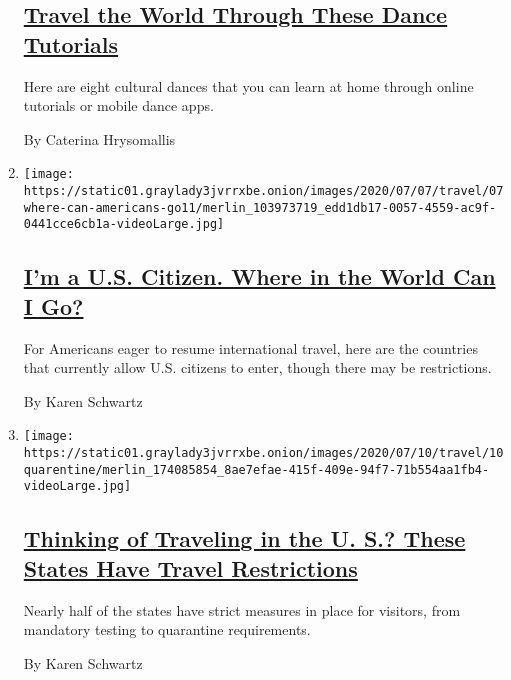 \begin{enumerate}
  \hypertarget{travel-the-world-through-these-dance-tutorials}{%
  \subsection{\texorpdfstring{\href{/2020/07/25/travel/cultural-dances-tutorials.html}{Travel
  the World Through These Dance
  Tutorials}}{Travel the World Through These Dance Tutorials}}\label{travel-the-world-through-these-dance-tutorials}}

  Here are eight cultural dances that you can learn at home through
  online tutorials or mobile dance apps.

  By Caterina Hrysomallis
\item
  \texttt{[image: https://static01.graylady3jvrrxbe.onion/images/2020/07/07/travel/07where-can-americans-go11/merlin\_103973719\_edd1db17-0057-4559-ac9f-0441cce6cb1a-videoLarge.jpg]}

  \hypertarget{im-a-us-citizen-where-in-the-world-can-i-go}{%
  \subsection{\texorpdfstring{\href{/2020/07/07/travel/american-travelers-restrictions-coronavirus.html}{I'm
  a U.S. Citizen. Where in the World Can I
  Go?}}{I'm a U.S. Citizen. Where in the World Can I Go?}}\label{im-a-us-citizen-where-in-the-world-can-i-go}}

  For Americans eager to resume international travel, here are the
  countries that currently allow U.S. citizens to enter, though there
  may be restrictions.

  By Karen Schwartz
\item
  \texttt{[image: https://static01.graylady3jvrrxbe.onion/images/2020/07/10/travel/10quarentine/merlin\_174085854\_8ae7efae-415f-409e-94f7-71b554aa1fb4-videoLarge.jpg]}

  \hypertarget{thinking-of-traveling-in-the-u-s-these-states-have-travel-restrictions}{%
  \subsection{\texorpdfstring{\href{/2020/07/10/travel/state-travel-restrictions.html}{Thinking
  of Traveling in the U. S.? These States Have Travel
  Restrictions}}{Thinking of Traveling in the U. S.? These States Have Travel Restrictions}}\label{thinking-of-traveling-in-the-u-s-these-states-have-travel-restrictions}}

  Nearly half of the states have strict measures in place for visitors,
  from mandatory testing to quarantine requirements.

  By Karen Schwartz
\end{enumerate}


